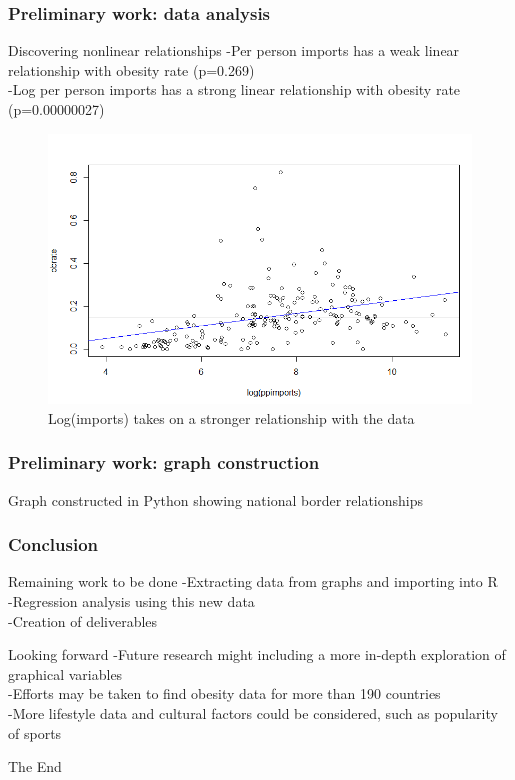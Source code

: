 \documentclass{beamer}
\begin{document}
\begin{frame}
\frametitle{Preliminary work: data analysis}
\begin{block}
{Discovering nonlinear relationships}
-Per person imports has a weak linear relationship with obesity rate (p=0.269)
\\
-Log per person imports has a strong linear relationship with obesity rate (p=0.00000027)
\end{block}

\begin{figure}
\label{fig:logs}
\caption{Log(imports) takes on a stronger relationship with the data}
\centering
\includegraphics[scale=0.4]{ppimports_log.PNG}
\end{figure}
\end{frame}

\begin{frame}
\frametitle{Preliminary work: graph construction}
Graph constructed in Python showing national border relationships
\end{frame}

\begin{frame}
\frametitle{Conclusion}
\begin{block}
{Remaining work to be done}
-Extracting data from graphs and importing into R
\\
-Regression analysis using this new data
\\
-Creation of deliverables
\end{block}

\begin{block}
{Looking forward}
-Future research might including a more in-depth exploration of graphical variables
\\
-Efforts may be taken to find obesity data for more than 190 countries
\\
-More lifestyle data and cultural factors could be considered, such as popularity of sports
\end{block}
\end{frame}
 
\begin{frame}
\centerline{The End}
\end{frame}
\end{document}

